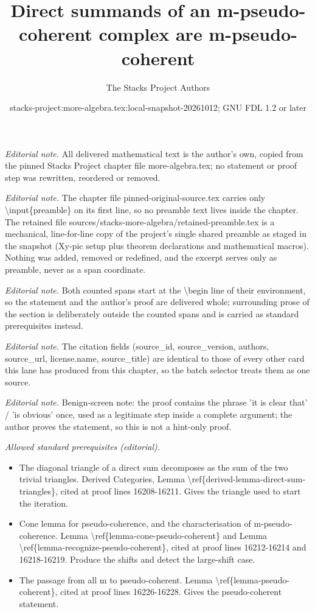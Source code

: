 \documentclass[10pt,a4paper]{amsart}
\title{Direct summands of an m-pseudo-coherent complex are m-pseudo-coherent}
\author{The Stacks Project Authors}
\date{stacks-project:more-algebra.tex:local-snapshot-20261012; GNU FDL 1.2 or later}
\theoremstyle{plain}
\theoremstyle{definition}
\theoremstyle{remark}
\numberwithin{equation}{subsection}
\begin{document}
\maketitle
\setcounter{subsection}{1}
\noindent\textit{Editorial note.} All delivered mathematical text is the author's own, copied from the pinned Stacks Project chapter file more-algebra.tex; no statement or proof step was rewritten, reordered or removed.\par\medskip
\noindent\textit{Editorial note.} The chapter file pinned-original-source.tex carries only \textbackslash{}input\{preamble\} on its first line, so no preamble text lives inside the chapter. The retained file sources/stacks-more-algebra/retained-preamble.tex is a mechanical, line-for-line copy of the project's single shared preamble as staged in the snapshot (Xy-pic setup plus theorem declarations and mathematical macros). Nothing was added, removed or redefined, and the excerpt serves only as preamble, never as a span coordinate.\par\medskip
\noindent\textit{Editorial note.} Both counted spans start at the \textbackslash{}begin line of their environment, so the statement and the author's proof are delivered whole; surrounding prose of the section is deliberately outside the counted spans and is carried as standard prerequisites instead.\par\medskip
\noindent\textit{Editorial note.} The citation fields (source\_id, source\_version, authors, source\_url, license.name, source\_title) are identical to those of every other card this lane has produced from this chapter, so the batch selector treats them as one source.\par\medskip
\noindent\textit{Editorial note.} Benign-screen note: the proof contains the phrase 'it is clear that' / 'is obvious' once, used as a legitimate step inside a complete argument; the author proves the statement, so this is not a hint-only proof.\par\medskip
\noindent\textit{Allowed standard prerequisites (editorial).}\begin{itemize}
\item The diagonal triangle of a direct sum decomposes as the sum of the two trivial triangles. Derived Categories, Lemma \textbackslash{}ref\{derived-lemma-direct-sum-triangles\}, cited at proof lines 16208-16211. Gives the triangle used to start the iteration.
\item Cone lemma for pseudo-coherence, and the characterisation of m-pseudo-coherence. Lemma \textbackslash{}ref\{lemma-cone-pseudo-coherent\} and Lemma \textbackslash{}ref\{lemma-recognize-pseudo-coherent\}, cited at proof lines 16212-16214 and 16218-16219. Produce the shifts and detect the large-shift case.
\item The passage from all m to pseudo-coherent. Lemma \textbackslash{}ref\{lemma-pseudo-coherent\}, cited at proof lines 16226-16228. Gives the pseudo-coherent statement.
\end{itemize}\medskip
\end{document}
